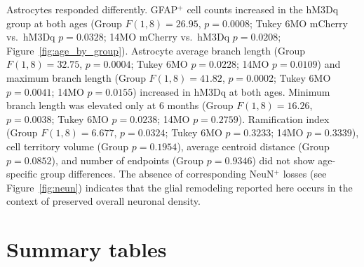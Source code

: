 \documentclass[11pt]{article}
\begin{document}
Astrocytes responded differently. GFAP$^{+}$ cell counts increased in the hM3Dq group at both ages (Group $F(1,8)=26.95$, $p=0.0008$; Tukey 6MO mCherry vs.~hM3Dq $p=0.0328$; 14MO mCherry vs.~hM3Dq $p=0.0208$; Figure~\ref{fig:age_by_group}). Astrocyte average branch length (Group $F(1,8)=32.75$, $p=0.0004$; Tukey 6MO $p=0.0228$; 14MO $p=0.0109$) and maximum branch length (Group $F(1,8)=41.82$, $p=0.0002$; Tukey 6MO $p=0.0041$; 14MO $p=0.0155$) increased in hM3Dq at both ages. Minimum branch length was elevated only at 6 months (Group $F(1,8)=16.26$, $p=0.0038$; Tukey 6MO $p=0.0238$; 14MO $p=0.2759$). Ramification index (Group $F(1,8)=6.677$, $p=0.0324$; Tukey 6MO $p=0.3233$; 14MO $p=0.3339$), cell territory volume (Group $p=0.1954$), average centroid distance (Group $p=0.0852$), and number of endpoints (Group $p=0.9346$) did not show age-specific group differences. The absence of corresponding NeuN$^{+}$ losses (see Figure~\ref{fig:neun}) indicates that the glial remodeling reported here occurs in the context of preserved overall neuronal density.

\section{Summary tables}
\end{document}
